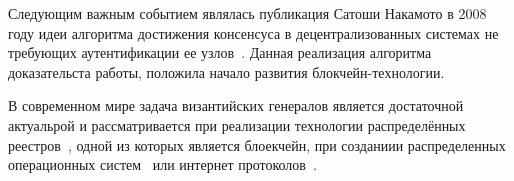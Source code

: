Следующим важным событием являлась публикация Сатоши Накамото в 2008 году идеи алгоритма достижения консенсуса в децентрализованных системах не требующих аутентификации ее узлов~\cite{Bitcoin}. Данная реализация алгоритма доказательста работы, положила начало развития блокчейн-технологии.

В современном мире задача византийских генералов является достаточной актуальрой и рассматривается при реализации технологии распределённых реестров~\cite{reestr}, одной из которых является блоекчейн, при созданиии распределенных операционных систем~\cite{lec} или интернет протоколов~\cite{icc}.






%
%
%



\clearpage
